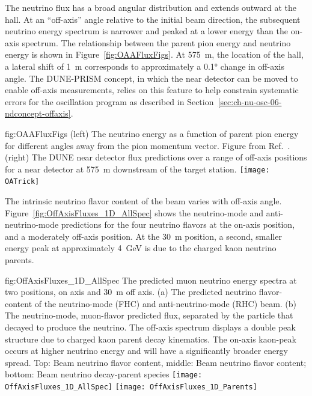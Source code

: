 The neutrino flux has a broad angular distribution and extends outward at the  hall. At an ``off-axis'' angle relative to the initial beam direction, the subsequent neutrino energy spectrum is narrower and peaked at a lower energy than the on-axis spectrum.
The relationship between the parent pion energy and neutrino energy is shown in Figure~\ref{fig:OAAFluxFigs}.  At \SI{575}{m}, the location of the  hall, a lateral shift of \SI{1}{m} corresponds to approximately a \ang{0.1} change in off-axis angle. 
The DUNE-PRISM concept, in which the near detector \lartpc can be moved to enable  off-axis measurements, relies on this feature to help constrain systematic errors for the  oscillation program as described in Section~\ref{sec:ch-nu-osc-06-ndconcept-offaxis}.

\begin{dunefigure} %
{fig:OAAFluxFigs}
{(left) The neutrino energy as a function of parent pion energy for different angles away from the pion momentum vector. Figure from Ref.~\cite{Duffy:2016owt}. (right) The DUNE near detector flux predictions over a range of off-axis positions for a near detector at \SI{575}{m} downstream of the target station. }
    \texttt{[image: OATrick]}
\end{dunefigure}

The intrinsic neutrino flavor content of the beam varies with off-axis angle. Figure~\ref{fig:OffAxisFluxes_1D_AllSpec} shows the neutrino-mode and anti-neutrino-mode predictions for the four neutrino flavors at the on-axis position, and a moderately off-axis position. At the \SI{30}{m} position, a second, smaller energy peak at approximately \SI{4}{\GeV} is due to the charged kaon neutrino parents. 

\begin{dunefigure}{fig:OffAxisFluxes_1D_AllSpec}
{The predicted muon neutrino energy spectra at two  positions, on axis and \SI{30}{m} off axis. (a) The predicted neutrino flavor-content of the neutrino-mode (FHC) and anti-neutrino-mode (RHC) beam. (b) The neutrino-mode, muon-flavor predicted flux, separated by the particle that decayed to produce the neutrino. The off-axis spectrum displays a double peak structure due to charged kaon parent decay kinematics. The on-axis kaon-peak occurs at higher neutrino energy and will have a significantly broader energy spread. Top: Beam neutrino flavor content, middle: Beam neutrino flavor content; bottom: Beam neutrino decay-parent species}
    \texttt{[image: OffAxisFluxes\_1D\_AllSpec]}
  \texttt{[image: OffAxisFluxes\_1D\_Parents]}    
    \end{dunefigure}



